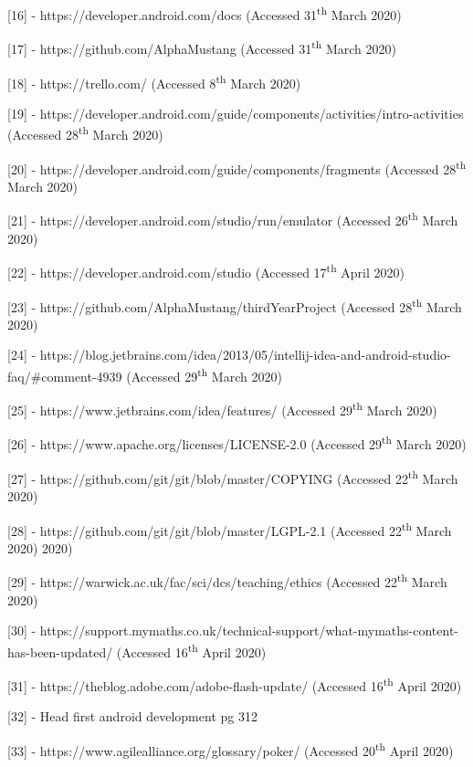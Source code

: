 \documentclass{article}
\begin{document}
[16] - https://developer.android.com/docs (Accessed 31\textsuperscript{th} March 2020) \par

[17] - https://github.com/AlphaMustang (Accessed 31\textsuperscript{th} March 2020) \par

[18] - https://trello.com/ (Accessed 8\textsuperscript{th} March 2020) \par

[19] - https://developer.android.com/guide/components/activities/intro-activities (Accessed 28\textsuperscript{th} March 2020) \par

[20] - https://developer.android.com/guide/components/fragments (Accessed 28\textsuperscript{th} March 2020) \par

[21] - https://developer.android.com/studio/run/emulator (Accessed 26\textsuperscript{th} March 2020) \par

[22] - https://developer.android.com/studio (Accessed 17\textsuperscript{th} April 2020) \par

[23] - https://github.com/AlphaMustang/thirdYearProject (Accessed 28\textsuperscript{th} March 2020) \par

[24] - https://blog.jetbrains.com/idea/2013/05/intellij-idea-and-android-studio-faq/\#comment-4939 (Accessed 29\textsuperscript{th} March 2020) \par

[25] - https://www.jetbrains.com/idea/features/ (Accessed 29\textsuperscript{th} March 2020) \par

[26] - https://www.apache.org/licenses/LICENSE-2.0 (Accessed 29\textsuperscript{th} March 2020) \par

[27] - https://github.com/git/git/blob/master/COPYING (Accessed 22\textsuperscript{th} March 2020) \par

[28] - https://github.com/git/git/blob/master/LGPL-2.1 (Accessed 22\textsuperscript{th} March 2020) 2020) \par

[29] - https://warwick.ac.uk/fac/sci/dcs/teaching/ethics (Accessed 22\textsuperscript{th} March 2020) \par

[30] - https://support.mymaths.co.uk/technical-support/what-mymaths-content-has-been-updated/ (Accessed 16\textsuperscript{th} April 2020) \par

[31] - https://theblog.adobe.com/adobe-flash-update/ (Accessed 16\textsuperscript{th} April 2020) \par

[32] - Head first android development pg 312

[33] - https://www.agilealliance.org/glossary/poker/ (Accessed 20\textsuperscript{th} April 2020)
\end{document}
